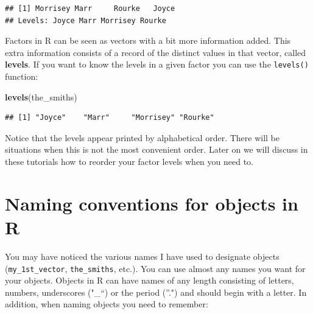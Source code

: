 \documentclass[]{book}
\newenvironment{Shaded}{\begin{snugshade}}{\end{snugshade}}
\newcommand{\KeywordTok}[1]{\textcolor[rgb]{0.13,0.29,0.53}{\textbf{#1}}}
\newcommand{\NormalTok}[1]{#1}
\begin{document}
\begin{verbatim}
## [1] Morrisey Marr     Rourke   Joyce   
## Levels: Joyce Marr Morrisey Rourke
\end{verbatim}

Factors in R can be seen as vectors with a bit more information added. This extra information consists of a record of the distinct values in that vector, called \textbf{levels}. If you want to know the levels in a given factor you can use the \texttt{levels()} function:

\begin{Shaded}
\begin{Highlighting}[]
\KeywordTok{levels}\NormalTok{(the_smiths)}
\end{Highlighting}
\end{Shaded}

\begin{verbatim}
## [1] "Joyce"    "Marr"     "Morrisey" "Rourke"
\end{verbatim}

Notice that the levels appear printed by alphabetical order. There will be situations when this is not the most convenient order. Later on we will discuss in these tutorials how to reorder your factor levels when you need to.

\hypertarget{naming-conventions-for-objects-in-r}{%
\section{Naming conventions for objects in R}\label{naming-conventions-for-objects-in-r}}

You may have noticed the various names I have used to designate objects (\texttt{my\_1st\_vector}, \texttt{the\_smiths}, etc.). You can use almost any names you want for your objects. Objects in R can have names of any length consisting of letters, numbers, underscores ("\_``) or the period (''.") and should begin with a letter. In addition, when naming objects you need to remember:
\end{document}
